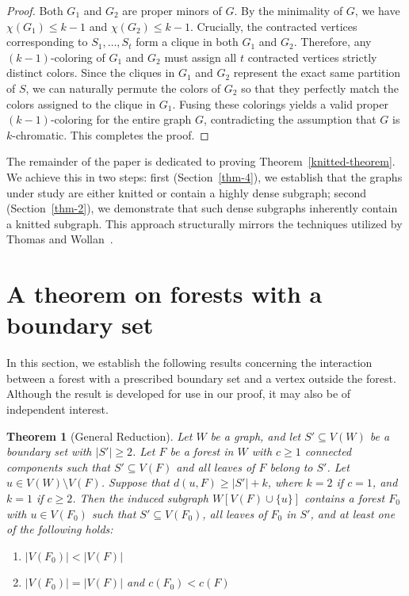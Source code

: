 \documentclass[11pt]{amsart}
\newtheorem{theorem}{Theorem}
\begin{document}
\begin{proof}
Both $G_1$ and $G_2$ are proper minors of $G$. By the minimality of $G$, we have $\chi(G_1) \le k-1$ and $\chi(G_2) \le k-1$. Crucially, the contracted vertices corresponding to $S_1, \dots, S_t$ form a clique in both $G_1$ and $G_2$. Therefore, any $(k-1)$-coloring of $G_1$ and $G_2$ must assign all $t$ contracted vertices strictly distinct colors. Since the cliques in $G_1$ and $G_2$ represent the exact same partition of $S$, we can naturally permute the colors of $G_2$ so that they perfectly match the colors assigned to the clique in $G_1$. Fusing these colorings yields a valid proper $(k-1)$-coloring for the entire graph $G$, contradicting the assumption that $G$ is $k$-chromatic. This completes the proof.
\end{proof}

The remainder of the paper is dedicated to proving Theorem~\ref{knitted-theorem}. We achieve this in two steps: first (Section~\ref{thm-4}), we establish that the graphs under study are either knitted or contain a highly dense subgraph; second (Section~\ref{thm-2}), we demonstrate that such dense subgraphs inherently contain a knitted subgraph. This approach structurally mirrors the techniques utilized by Thomas and Wollan~\cite{TW05}.


\section{A theorem on forests with a boundary set}

In this section, we establish the following results concerning the interaction between a forest with a prescribed boundary set and a vertex outside the forest. Although the result is developed for use in our proof, it may also be of independent interest.

\begin{theorem}[General Reduction]\label{thm:unified}
Let $W$ be a graph, and let $S' \subseteq V(W)$ be a boundary set with $|S'| \ge 2$. Let $F$ be a forest in $W$ with $c \ge 1$ connected components such that $S' \subseteq V(F)$ and all leaves of $F$ belong to $S'$. Let $u \in V(W) \setminus V(F)$. Suppose that $d(u, F) \ge |S'| + k$, where $k = 2$ if $c = 1$, and $k = 1$ if $c \ge 2$. Then the induced subgraph $W[V(F) \cup \{u\}]$ contains a forest $F_0$ with $u \in V(F_0)$ such that $S' \subseteq V(F_0)$, all leaves of $F_0$ in $S'$, and at least one of the following holds:
\begin{enumerate}
    \item $|V(F_0)| < |V(F)|$ \quad {}
    \item $|V(F_0)| = |V(F)|$ and $c(F_0) < c(F)$ \quad {}
\end{enumerate}
\end{theorem}
\end{document}
